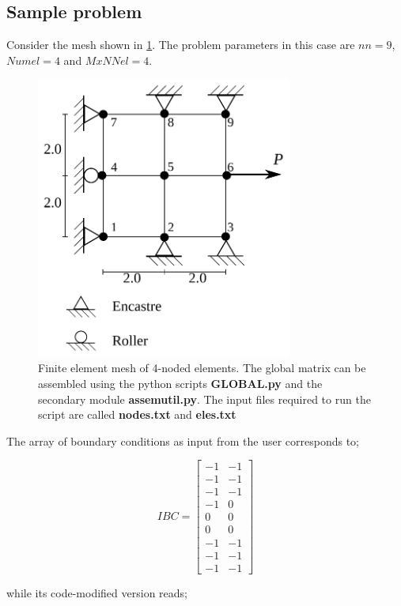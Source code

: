 \subsection*{Sample problem}
Consider the mesh shown in \cref{fig:quad}. The problem parameters in this case are $nn=9$, $Numel=4$ and $MxNNel=4$.

\begin{figure}[h]
\centering
\includegraphics[width=0.75\textwidth]{mesh2.pdf}
\caption{Finite element mesh of 4-noded elements. The global matrix can be assembled using the python scripts {\bf GLOBAL.py} and the secondary module {\bf assemutil.py}. The input files required to run the script are called {\bf nodes.txt} and {\bf eles.txt}}
\label{fig:quad}
\end{figure}

%
The array of boundary conditions as input from the user corresponds to;


\[IBC = \left[ {\begin{array}{*{20}{c}}
{ - 1}&{ - 1}\\
{ - 1}&{ - 1}\\
{ - 1}&{ - 1}\\
{ - 1}&0\\
0&0\\
0&0\\
{ - 1}&{ - 1}\\
{ - 1}&{ - 1}\\
{ - 1}&{ - 1}
\end{array}} \right]\]

while its code-modified version reads;


